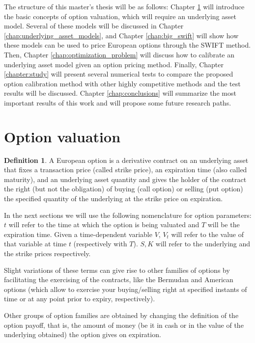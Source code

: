\documentclass[12,twoside]{mammeTFM}
\theoremstyle{definition}
\newtheorem{definition}[thm]{Definition}
\theoremstyle{remark}
\begin{document}
The structure of this master's thesis will be as follows: Chapter \ref{chapter:option_valuation} will introduce the basic concepts of option valuation, which will require an underlying asset model. Several of these models will be discussed in Chapter \ref{chap:underlying_asset_models}, and Chapter \ref{chap:big_swift} will show how these models can be used to price European options through the SWIFT method. Then, Chapter \ref{chap:optimization_problem} will discuss how to calibrate an underlying asset model given an option pricing method. Finally, Chapter \ref{chapter:study} will present several numerical tests to compare the proposed option calibration method with other highly competitive methods and the test results will be discussed. Chapter \ref{chap:conclusions} will summarize the most important results of this work and will propose some future research paths.

\section{Option valuation}\label{chapter:option_valuation}

\begin{definition}
A European option is a derivative contract on an underlying asset that fixes a transaction price (called strike price), an expiration time (also called maturity), and an underlying asset quantity and gives the holder of the contract the right (but not the obligation) of buying (call option) or selling (put option) the specified quantity of the underlying at the strike price on expiration.
\end{definition}

In the next sections we will use the following nomenclature for option parameters: $t$ will refer to the time at which the option is being valuated and $T$ will be the expiration time. Given a time-dependent variable $V$, $V_t$ will refer to the value of that variable at time $t$ (respectively with $T$). $S, K$ will refer to the underlying and the strike prices respectively.

Slight variations of these terms can give rise to other families of options by facilitating the exercising of the contracts, like the Bermudan and American options (which allow to exercise your buying/selling right at specified instants of time or at any point prior to expiry, respectively).

Other groups of option families are obtained by changing the definition of the option payoff, that is, the amount of money (be it in cash or in the value of the underlying obtained) the option gives on expiration.
\end{document}
